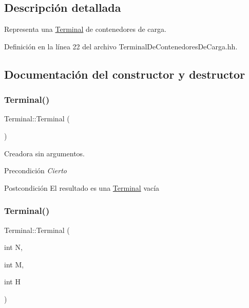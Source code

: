 \subsection{Descripción detallada}
Representa una \hyperlink{class_terminal}{Terminal} de contenedores de carga. 

Definición en la línea 22 del archivo Terminal\+De\+Contenedores\+De\+Carga.\+hh.



\subsection{Documentación del constructor y destructor}
\mbox{\label{class_terminal_aa448509b5aa1ece53c3d86385655be0e}} 
\subsubsection{\texorpdfstring{Terminal()}{Terminal()}\hspace{0.1cm}{\footnotesize\ttfamily [1/3]}}
{\footnotesize\ttfamily Terminal\+::\+Terminal (\begin{DoxyParamCaption}{ }\end{DoxyParamCaption})}



Creadora sin argumentos. 

\begin{DoxyPrecond}{Precondición}
{\itshape Cierto} 
\end{DoxyPrecond}
\begin{DoxyPostcond}{Postcondición}
El resultado es una \hyperlink{class_terminal}{Terminal} vacía 
\end{DoxyPostcond}
\mbox{\label{class_terminal_a696ee89f0fc7359b528c9f8f2aec064f}} 
\subsubsection{\texorpdfstring{Terminal()}{Terminal()}\hspace{0.1cm}{\footnotesize\ttfamily [2/3]}}
{\footnotesize\ttfamily Terminal\+::\+Terminal (\begin{DoxyParamCaption}\item[{int}]{N,  }\item[{int}]{M,  }\item[{int}]{H }\end{DoxyParamCaption})}



